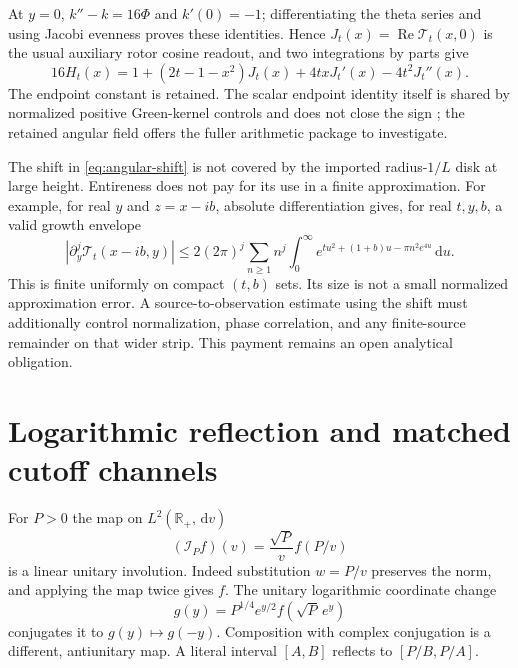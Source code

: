 \documentclass[11pt]{article}
\theoremstyle{definition}
\theoremstyle{remark}
\newcommand{\dd}{\,\mathrm d}
\newcommand{\Rea}{\operatorname{Re}}
\begin{document}
At $y=0$, $k''-k=16\Phi$ and $k'(0)=-1$; differentiating the theta
series and using Jacobi evenness proves these identities. Hence
$J_t(x)=\Rea\mathcal T_t(x,0)$ is the usual auxiliary rotor cosine
readout, and two integrations by parts give
\begin{equation}
 16H_t(x)=1+(2t-1-x^2)J_t(x)+4txJ_t'(x)-4t^2J_t''(x).
 \label{eq:affine-ward}
\end{equation}
The endpoint constant is retained. The scalar endpoint identity itself
is shared by normalized positive Green-kernel controls and does not close
the sign \cite{thetanotes}; the retained angular field offers the fuller
arithmetic package to investigate.

The shift in \eqref{eq:angular-shift} is not covered by the imported
radius-$1/L$ disk at large height. Entireness does not pay for its use in
a finite approximation. For example, for real $y$ and $z=x-ib$,
absolute differentiation gives, for real $t,y,b$, a valid growth envelope
\begin{equation}
 |\partial_y^j\mathcal T_t(x-ib,y)|
 \le2(2\pi)^j\sum_{n\ge1}n^j
       \int_0^\infty e^{tu^2+(1+b)u-\pi n^2e^{4u}}\dd u.
 \label{eq:angular-growth}
\end{equation}
This is finite uniformly on compact $(t,b)$ sets. Its size is not a
small normalized approximation error. A source-to-observation estimate
using the shift must additionally control normalization, phase correlation,
and any finite-source remainder on that wider strip. This payment remains
an open analytical obligation.

\section{Logarithmic reflection and matched cutoff channels}
\label{sec:reflection}

For $P>0$ the map on $L^2(\mathbb R_+,\dd v)$
\begin{equation}
 (\mathcal I_Pf)(v)=\frac{\sqrt P}{v}f(P/v)
 \label{eq:inversion}
\end{equation}
is a linear unitary involution. Indeed substitution $w=P/v$ preserves
the norm, and applying the map twice gives $f$. The unitary logarithmic
coordinate change
\begin{equation}
 g(y)=P^{1/4}e^{y/2}f(\sqrt P\,e^y)
 \label{eq:logunitary}
\end{equation}
conjugates it to $g(y)\mapsto g(-y)$. Composition with complex
conjugation is a different, antiunitary map. A literal interval $[A,B]$
reflects to $[P/B,P/A]$.
\end{document}
